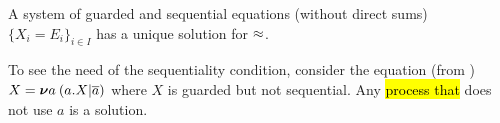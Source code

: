



\begin{theorem}
\label{t:Mil89}
A system of guarded and sequential equations (without direct sums)
$\{  X_i = E_i\}_{i\in I}$ has a unique solution for $\approx$.
\end{theorem}

To see the  need of the sequentiality  condition, consider
 the equation (from \cite{Mil89}) $X = {\boldsymbol \nu} a\: (a. X | \overline{a})$
where $X$ is guarded but not sequential. Any \hl{process that} does not use $a$ is a solution.
